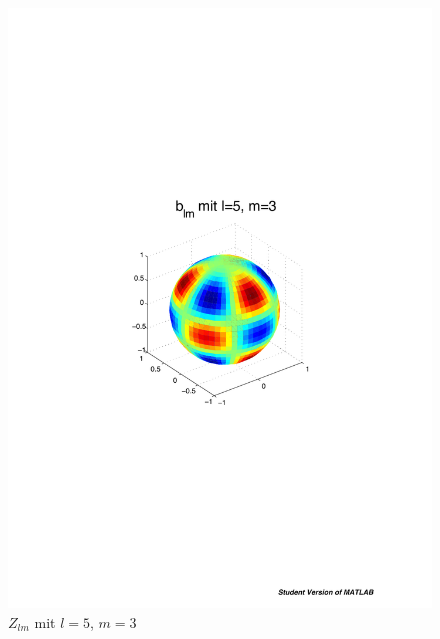 \begin{refsection}
\begin{figure}
\begin{minipage}[hbt]{0.4\textwidth}
\includegraphics[width=1\textwidth]{kugel/ylm/b_5_3.pdf}
\caption{$Z_{lm}$ mit $l=5$, $m=3$}
\label{skript:zlm l=5 m=3}
\end{minipage}
\begin{minipage}[hbt]{0.4\textwidth}
\centering

\end{minipage}
\end{figure}
\end{refsection}
